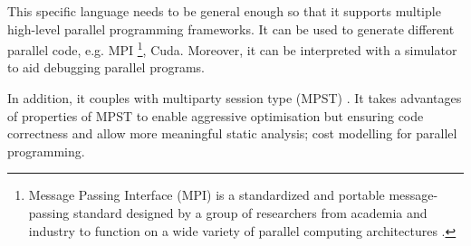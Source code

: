 This specific language needs to be general enough so that it supports multiple high-level parallel programming frameworks. It can be used to generate different parallel code, e.g. MPI \footnote{Message Passing Interface (MPI) is a standardized and portable message-passing standard designed by a group of researchers from academia and industry to function on a wide variety of parallel computing architectures \cite{MessagePassingInterface2018}.}, Cuda. Moreover, it can be interpreted with a simulator to aid debugging parallel programs.


In addition, it couples with multiparty session type (MPST) \cite{coppoGentleIntroductionMultiparty2015}. It takes advantages of properties of MPST to enable aggressive optimisation but ensuring code correctness and allow more meaningful static analysis; \eg cost modelling for parallel programming. %
